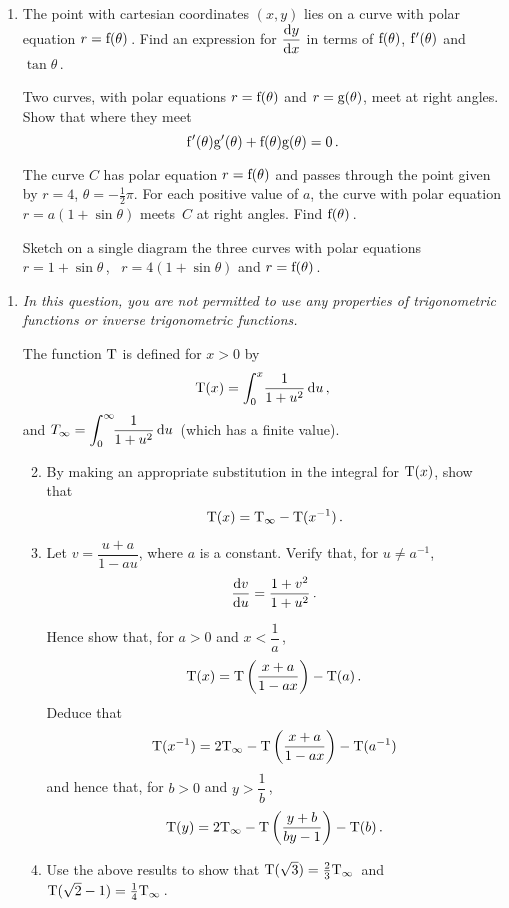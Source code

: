 \documentclass[a4, 11pt]{report}
\newlength{\qspace}
\newcounter{qnumber}
\newenvironment{question}%
 {\vspace{\qspace}
  \begin{enumerate}[\bfseries 1\quad][10]%
    \setcounter{enumi}{\value{qnumber}}%
    \item%
 }
{
  \end{enumerate}
  \filbreak
  \stepcounter{qnumber}
 }
\newenvironment{questionparts}[1][1]%
 {
  \begin{enumerate}[\bfseries (i)]%
    \setcounter{enumii}{#1}
    \addtocounter{enumii}{-1}
    \setlength{\itemsep}{5mm}
    \setlength{\parskip}{3pt}
 }
 {
  \end{enumerate}
 }
\def\d{{\rm d}}
\def\g{{\rm g}}
\def\f{{\rm f}}
\def\T{{\rm T}}
\begin{document}
\begin{question}
The  point with cartesian coordinates $(x,y)$ lies on a
curve with polar equation $r=\f(\theta)\,$. 
Find an  expression for $\dfrac{\d y}{\d x}$ in terms of $\f(\theta)$,
$\f'(\theta)$ and $\tan\theta\,$.

Two curves, with polar equations $r=\f(\theta)$ and 
$r=\g(\theta)$, meet at right angles.
Show
that where they meet 
\[
\f'(\theta) \g'(\theta) +\f(\theta)\g(\theta) = 0 \,.
\]

The curve $C$ has polar equation $r=\f(\theta)$ and passes through
the point given by $r=4$, $\theta = - \frac12\pi$. 
For each positive value of $a$,   
the curve with polar equation
$r= a(1+\sin\theta)$ 
meets~$C$ at right angles. Find $\f(\theta)\,$.

Sketch on a single diagram the three curves 
with polar equations $r= 1+\sin\theta\,$, \   
$r= 4(1+\sin\theta)$  and $r=\f(\theta)\,$.


\end{question}

\vspace{-3mm}


\begin{question}
{\em In this question, you are not permitted to use any properties of 
trigonometric functions or inverse trigonometric functions.}

The function $\T$ is defined for  $x>0$ by
\[
\T(x) = \int_0^x \! \frac 1 {1+u^2} \, \d u\,,
\]
and $\displaystyle T_\infty = 
 \int_0^\infty \!\! \frac 1 {1+u^2} \, \d u\,$ (which has a finite value).

\begin{questionparts}
\item 
By making an appropriate substitution in the integral for $\T(x)$,
 show that \[\T(x) = \T_\infty - \T(x^{-1})\,.\]


\item
Let  $v= \dfrac{u+a}{1-au}$, where $a$ is a constant. Verify that, for
$u\ne a^{-1}$, 
\[
\frac{\d v}{\d u} = \frac{1+v^2}{1+u^2}
\,.
\]

Hence show that, for $a>0$ and $x< \dfrac1a\,$, 
\[
\T(x)  = \T\left(\frac{x+a}{1-ax}\right) -\T(a) \,.
\]
Deduce that
\[
\T(x^{-1}) 
 = 2\T_\infty -\T\left(\frac{x+a}{1-ax}\right) 
-\T(a^{-1})  
\]
and hence that, for
 $b>0$ and $y>\dfrac1b\,$, 
\[
\T(y)   =2\T_\infty - \T\left(\frac{y+b}{by-1}\right) - \T(b) \,.
\]

\item Use the above results to show that 
$\T(\sqrt3)= \tfrac23 \T_\infty \,$
and 
$\T(\sqrt2 -1)= \frac14 \T_\infty\,$.
\end{questionparts}
\end{question}
\end{document}
